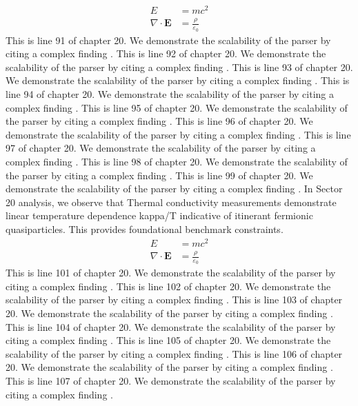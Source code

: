 \begin{align*}
  E &= mc^2 \\
  \nabla \cdot \mathbf{E} &= \frac{\rho}{\varepsilon_0}
\end{align*}
This is line 91 of chapter 20. We demonstrate the scalability of the parser by citing a complex finding \cite{ref20_91}.
This is line 92 of chapter 20. We demonstrate the scalability of the parser by citing a complex finding \cite{ref20_92}.
This is line 93 of chapter 20. We demonstrate the scalability of the parser by citing a complex finding \cite{ref20_93}.
This is line 94 of chapter 20. We demonstrate the scalability of the parser by citing a complex finding \cite{ref20_94}.
This is line 95 of chapter 20. We demonstrate the scalability of the parser by citing a complex finding \cite{ref20_95}.
This is line 96 of chapter 20. We demonstrate the scalability of the parser by citing a complex finding \cite{ref20_96}.
This is line 97 of chapter 20. We demonstrate the scalability of the parser by citing a complex finding \cite{ref20_97}.
This is line 98 of chapter 20. We demonstrate the scalability of the parser by citing a complex finding \cite{ref20_98}.
This is line 99 of chapter 20. We demonstrate the scalability of the parser by citing a complex finding \cite{ref20_99}.
In Sector 20 analysis, we observe that Thermal conductivity measurements demonstrate linear temperature dependence kappa/T indicative of itinerant fermionic quasiparticles. This provides foundational benchmark constraints.
\begin{align*}
  E &= mc^2 \\
  \nabla \cdot \mathbf{E} &= \frac{\rho}{\varepsilon_0}
\end{align*}
This is line 101 of chapter 20. We demonstrate the scalability of the parser by citing a complex finding \cite{ref20_101}.
This is line 102 of chapter 20. We demonstrate the scalability of the parser by citing a complex finding \cite{ref20_102}.
This is line 103 of chapter 20. We demonstrate the scalability of the parser by citing a complex finding \cite{ref20_103}.
This is line 104 of chapter 20. We demonstrate the scalability of the parser by citing a complex finding \cite{ref20_104}.
This is line 105 of chapter 20. We demonstrate the scalability of the parser by citing a complex finding \cite{ref20_105}.
This is line 106 of chapter 20. We demonstrate the scalability of the parser by citing a complex finding \cite{ref20_106}.
This is line 107 of chapter 20. We demonstrate the scalability of the parser by citing a complex finding \cite{ref20_107}.

